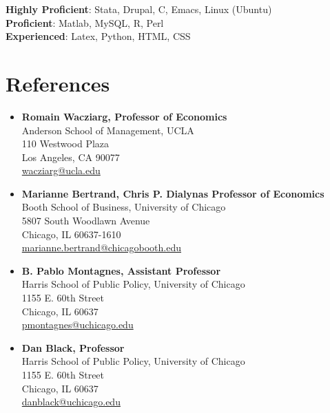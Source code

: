 \documentclass[11pt]{article}
\begin{document}
\textbf{Highly Proficient}: Stata, Drupal, C, Emacs, Linux (Ubuntu) \\
\textbf{Proficient}: Matlab, MySQL, R, Perl \\
\textbf{Experienced}: Latex, Python, HTML, CSS \\
\section{References}
\label{sec-7}

\vspace{-0.2in}
\begin{multicols}{2}
\begin{itemize}
\item \textbf{Romain Wacziarg, Professor of Economics} \\
Anderson School of Management, UCLA \\ 
  110 Westwood Plaza\\
  Los Angeles, CA 90077\\
  \href{mailto:wacziarg@ucla.edu}{wacziarg@ucla.edu}\\
\item \textbf{Marianne Bertrand, Chris P. Dialynas Professor of Economics} \\
Booth School of Business, University of Chicago \\ 
  5807 South Woodlawn Avenue\\
  Chicago, IL 60637-1610\\
  \href{mailto:marianne.bertrand@chicagobooth.edu}{marianne.bertrand@chicagobooth.edu}\\
\item \textbf{B. Pablo Montagnes, Assistant Professor} \\
Harris School of Public Policy, University of Chicago \\
  1155 E. 60th Street\\
  Chicago, IL 60637\\
  \href{mailto:pmontagnes@uchicago.edu}{pmontagnes@uchicago.edu}\\
\item \textbf{Dan Black, Professor}\\
Harris School of Public Policy, University of Chicago \\
  1155 E. 60th Street\\
  Chicago, IL 60637\\
  \href{mailto:danblack@uchicago.edu}{danblack@uchicago.edu}\\
\end{itemize}
\end{multicols}
\end{document}
